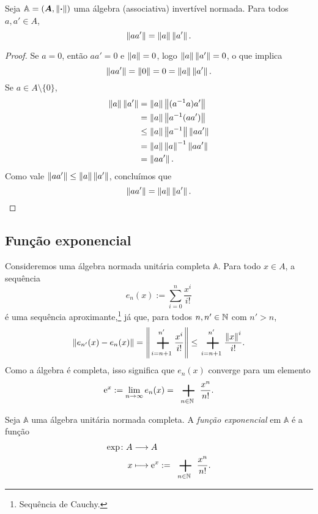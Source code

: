 \begin{exercise}
Seja $\mathbb A = (\bm A,\left\Vert{\bm{\cdot}}\right\Vert)$ uma álgebra (associativa) invertível normada. Para todos $a,a' \in A$,
	\begin{equation*}
	\left\Vert{aa'}\right\Vert = \left\Vert{a}\right\Vert\left\Vert{a'}\right\Vert.
	\end{equation*}
\end{exercise}
\begin{proof}
Se $a=0$, então $aa' = 0$ e $\left\Vert{a}\right\Vert=0$, logo $\left\Vert{a}\right\Vert\left\Vert{a'}\right\Vert=0$, o que implica
	\begin{equation*}
	\left\Vert{aa'}\right\Vert = \left\Vert{0}\right\Vert = 0 = \left\Vert{a}\right\Vert\left\Vert{a'}\right\Vert.
	\end{equation*}
Se $a \in A \setminus \{0\}$,
	\begin{align*}
	\left\Vert{a}\right\Vert\left\Vert{a'}\right\Vert &= \left\Vert{a}\right\Vert\left\Vert{(a^{-1}a)a'}\right\Vert \\
		&= \left\Vert{a}\right\Vert\left\Vert{a^{-1}(aa')}\right\Vert \\
		&\leq \left\Vert{a}\right\Vert\left\Vert{a^{-1}}\right\Vert \left\Vert{aa'}\right\Vert \\
		&= \left\Vert{a}\right\Vert\left\Vert{a}\right\Vert^{-1} \left\Vert{aa'}\right\Vert \\
		&= \left\Vert{aa'}\right\Vert.
	\end{align*}
Como vale $\left\Vert{aa'}\right\Vert \leq \left\Vert{a}\right\Vert\left\Vert{a'}\right\Vert$, concluímos que
	\begin{equation*}
	\left\Vert{aa'}\right\Vert = \left\Vert{a}\right\Vert\left\Vert{a'}\right\Vert.
	\qedhere
	\end{equation*}
\end{proof}


\subsection{Função exponencial}

Consideremos uma álgebra normada unitária completa $\mathbb A$. Para todo $x \in A$, a sequência
	\begin{equation*}
	e_n(x) := \sum_{i=0}^{n} \frac{x^i}{i!}
	\end{equation*}
é uma sequência aproximante,\footnote{Sequência de Cauchy.} já que, para todos $n,n' \in \mathbb{N}$ com $n' > n$,
	\begin{equation*}
	\nor{e_{n'}(x)-e_n(x)} = \nor{\sum_{i=n+1}^{n'} \frac{x^i}{i!}} \leq \sum_{i=n+1}^{n'} \frac{\nor{x}^i}{i!}.
	\end{equation*}
Como a álgebra é completa, isso significa que $e_n(x)$ converge para um elemento
	\begin{equation*}
	\e^{x} := \lim_{n \to \infty} e_n(x) = \sum_{n \in \N} \frac{x^n}{n!}.
	\end{equation*}

\begin{definition}
Seja $\mathbb A$ uma álgebra unitária normada completa. A \emph{função exponencial} em $\mathbb A$ é a função
	\begin{align*}
	\func{\exp}{A}{A}{x}{\e^{x} := \sum_{n \in \N} \frac{x^n}{n!}.}
	\end{align*}
\end{definition}

